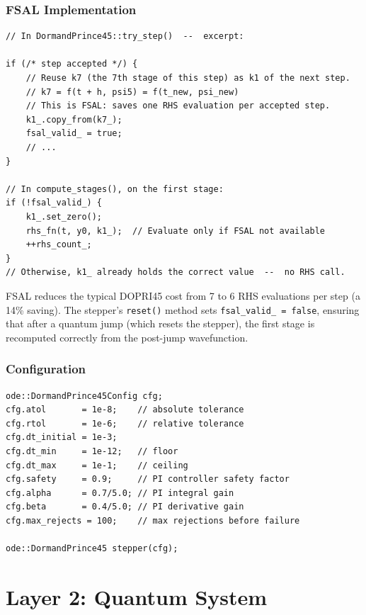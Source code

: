 \documentclass[11pt,a4paper,twoside]{book}
\newcommand{\code}[1]{\texttt{\small#1}}
\theoremstyle{definition}
\theoremstyle{remark}
\begin{document}
\subsection{FSAL Implementation}
\label{subsec:fsal}

\begin{verbatim}
// In DormandPrince45::try_step()  --  excerpt:

if (/* step accepted */) {
    // Reuse k7 (the 7th stage of this step) as k1 of the next step.
    // k7 = f(t + h, psi5) = f(t_new, psi_new)
    // This is FSAL: saves one RHS evaluation per accepted step.
    k1_.copy_from(k7_);
    fsal_valid_ = true;
    // ...
}

// In compute_stages(), on the first stage:
if (!fsal_valid_) {
    k1_.set_zero();
    rhs_fn(t, y0, k1_);  // Evaluate only if FSAL not available
    ++rhs_count_;
}
// Otherwise, k1_ already holds the correct value  --  no RHS call.
\end{verbatim}

\begin{perfbox}
  FSAL reduces the typical DOPRI45 cost from 7 to 6 RHS evaluations
  per step (a 14\% saving). The stepper's \code{reset()} method sets
  \code{fsal\_valid\_ = false}, ensuring that after a quantum jump
  (which resets the stepper), the first stage is recomputed correctly
  from the post-jump wavefunction.
\end{perfbox}

\subsection{Configuration}
\label{subsec:dopri45-config}

\begin{verbatim}
ode::DormandPrince45Config cfg;
cfg.atol       = 1e-8;    // absolute tolerance
cfg.rtol       = 1e-6;    // relative tolerance
cfg.dt_initial = 1e-3;
cfg.dt_min     = 1e-12;   // floor
cfg.dt_max     = 1e-1;    // ceiling
cfg.safety     = 0.9;     // PI controller safety factor
cfg.alpha      = 0.7/5.0; // PI integral gain
cfg.beta       = 0.4/5.0; // PI derivative gain
cfg.max_rejects = 100;    // max rejections before failure

ode::DormandPrince45 stepper(cfg);
\end{verbatim}

\chapter{Layer 2: Quantum System}
\label{chap:system}
\end{document}
